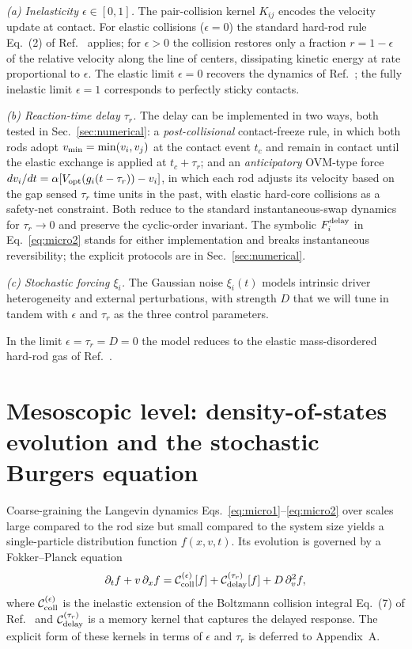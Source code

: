 \documentclass[aps,pre,twocolumn,superscriptaddress,longbibliography,floatfix]{revtex4-2}
\begin{document}
\emph{(a) Inelasticity $\epsilon\in[0,1]$.} The pair-collision
kernel $K_{ij}$ encodes the velocity update at contact. For
elastic collisions ($\epsilon=0$) the standard hard-rod rule
Eq.~(2) of Ref.~\cite{PaperIV} applies; for $\epsilon>0$ the
collision restores only a fraction $r=1-\epsilon$ of the
relative velocity along the line of centers, dissipating
kinetic energy at rate proportional to $\epsilon$. The
elastic limit $\epsilon=0$ recovers the dynamics of
Ref.~\cite{PaperIII,PaperIV}; the fully inelastic limit
$\epsilon=1$ corresponds to perfectly sticky contacts.

\emph{(b) Reaction-time delay $\tau_r$.} The delay can be
implemented in two ways, both tested in
Sec.~\ref{sec:numerical}: a \emph{post-collisional}
contact-freeze rule, in which both rods adopt
$v_{\rm min}=\min(v_i,v_j)$ at the contact event $t_c$
and remain in contact until the elastic exchange is applied
at $t_c+\tau_r$; and an \emph{anticipatory} OVM-type force
$dv_i/dt=\alpha[V_{\rm opt}(g_i(t-\tau_r))-v_i]$, in which
each rod adjusts its velocity based on the gap sensed
$\tau_r$ time units in the past, with elastic hard-core collisions as
a safety-net constraint. Both reduce to the standard
instantaneous-swap dynamics for $\tau_r\to 0$ and preserve
the cyclic-order invariant. The symbolic
$F_i^{\rm delay}$ in Eq.~\eqref{eq:micro2} stands for
either implementation and breaks instantaneous
reversibility; the explicit protocols are in
Sec.~\ref{sec:numerical}.

\emph{(c) Stochastic forcing $\xi_i$.} The Gaussian noise
$\xi_i(t)$ models intrinsic driver heterogeneity and external
perturbations, with strength $D$ that we will tune in tandem
with $\epsilon$ and $\tau_r$ as the three control parameters.

In the limit $\epsilon=\tau_r=D=0$ the model reduces to the
elastic mass-disordered hard-rod gas of
Ref.~\cite{PaperIII}.

\section{Mesoscopic level: density-of-states evolution and
the stochastic Burgers equation}\label{sec:meso}

Coarse-graining the Langevin dynamics
Eqs.~\eqref{eq:micro1}--\eqref{eq:micro2} over scales large
compared to the rod size but small compared to the system
size yields a single-particle distribution function
$f(x,v,t)$. Its evolution is governed by a Fokker--Planck
equation
\begin{equation}
\partial_t f + v\,\partial_x f
= \mathcal{C}_{\rm coll}^{(\epsilon)}[f]
+ \mathcal{C}_{\rm delay}^{(\tau_r)}[f]
+ D\,\partial_v^2 f,
\label{eq:fp}
\end{equation}
where $\mathcal{C}_{\rm coll}^{(\epsilon)}$ is the inelastic
extension of the Boltzmann collision integral Eq.~(7) of
Ref.~\cite{PaperIV} and $\mathcal{C}_{\rm delay}^{(\tau_r)}$
is a memory kernel that captures the delayed response. The
explicit form of these kernels in terms of $\epsilon$ and
$\tau_r$ is deferred to Appendix~A.
\end{document}

